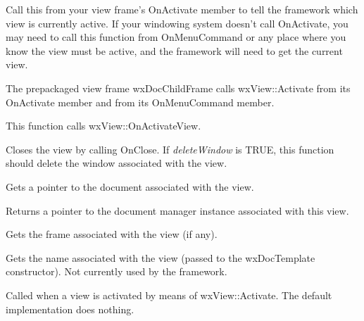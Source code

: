 

Call this from your view frame's OnActivate member to tell the framework which view is
currently active. If your windowing system doesn't call OnActivate, you may need to
call this function from OnMenuCommand or any place where you know the view must
be active, and the framework will need to get the current view.

The prepackaged view frame wxDocChildFrame calls wxView::Activate from its OnActivate member
and from its OnMenuCommand member.

This function calls wxView::OnActivateView.



Closes the view by calling OnClose. If {\it deleteWindow} is TRUE, this function should
delete the window associated with the view.



Gets a pointer to the document associated with the view.



Returns a pointer to the document manager instance associated with this view.



Gets the frame associated with the view (if any).



Gets the name associated with the view (passed to the wxDocTemplate constructor).
Not currently used by the framework.



Called when a view is activated by means of wxView::Activate. The default implementation does
nothing.

